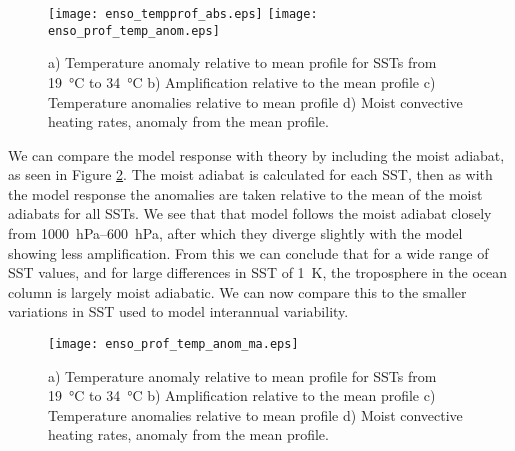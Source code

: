 \begin{figure}[ht]
\texttt{[image: enso\_tempprof\_abs.eps]}
\texttt{[image: enso\_prof\_temp\_anom.eps]}
\caption{a) Temperature anomaly relative to mean profile for SSTs from 
\SI{19}{\degreeCelsius} to \SI{34}{\degreeCelsius} b) Amplification relative to 
the mean profile c) Temperature anomalies relative to mean profile d) Moist 
convective heating rates, anomaly from the mean profile.}
\label{fig:scmsstprof_large}
\end{figure}

We can compare the model response with theory by including the moist adiabat, as 
seen in Figure \ref{fig:scmsstprof_ma}. The moist adiabat is calculated for each 
SST, then as with the model response the anomalies are taken relative to the 
mean of the moist adiabats for all SSTs. We see that that model follows the 
moist adiabat closely from \SIrange{1000}{600}{\hecto\pascal}, after which they 
diverge slightly with the model showing less amplification. From this we can 
conclude that for a wide range of SST values, and for large differences in SST 
of \SI{1}{\kelvin}, the troposphere in the ocean column is largely moist 
adiabatic.  We can now compare this to the smaller variations in SST used to 
model interannual variability.

\begin{figure}[ht]
\texttt{[image: enso\_prof\_temp\_anom\_ma.eps]}
\caption{a) Temperature anomaly relative to mean profile for SSTs from 
\SI{19}{\degreeCelsius} to \SI{34}{\degreeCelsius} b) Amplification relative to 
the mean profile c) Temperature anomalies relative to mean profile d) Moist 
convective heating rates, anomaly from the mean profile.}
\label{fig:scmsstprof_ma}
\end{figure}

